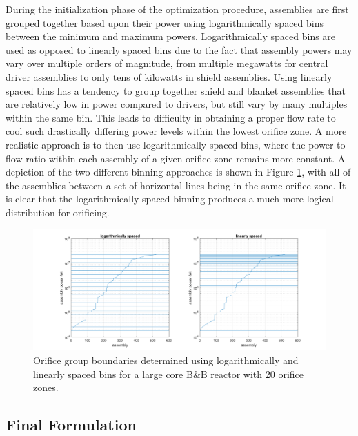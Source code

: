 \documentclass[11pt, oneside]{article}   	%
\begin{document}
During the initialization phase of the optimization procedure, assemblies are first grouped together based upon their power using logarithmically spaced bins between the minimum and maximum powers.
Logarithmically spaced bins are used as opposed to linearly spaced bins due to the fact that assembly powers may vary over multiple orders of magnitude, from multiple megawatts for central driver assemblies to only tens of kilowatts in shield assemblies. 
Using linearly spaced bins has a tendency to group together shield and blanket assemblies that are relatively low in power compared to drivers, but still vary by many multiples within the same bin.
This leads to difficulty in obtaining a proper flow rate to cool such drastically differing power levels within the lowest orifice zone.
A more realistic approach is to then use logarithmically spaced bins, where the power-to-flow ratio within each assembly of a given orifice zone remains more constant.
A depiction of the two different binning approaches is shown in Figure \ref{fig:binning}, with all of the assemblies between a set of horizontal lines being in the same orifice zone.
It is clear that the logarithmically spaced binning produces a much more logical distribution for orificing.

\begin{figure}[h!]
\includegraphics[width=18cm]{binning}
\centering
\caption{Orifice group boundaries determined using logarithmically and linearly spaced bins for a large core B\&B reactor with 20 orifice zones.}
\label{fig:binning}
\end{figure}

\subsection{Final Formulation}
\end{document}

